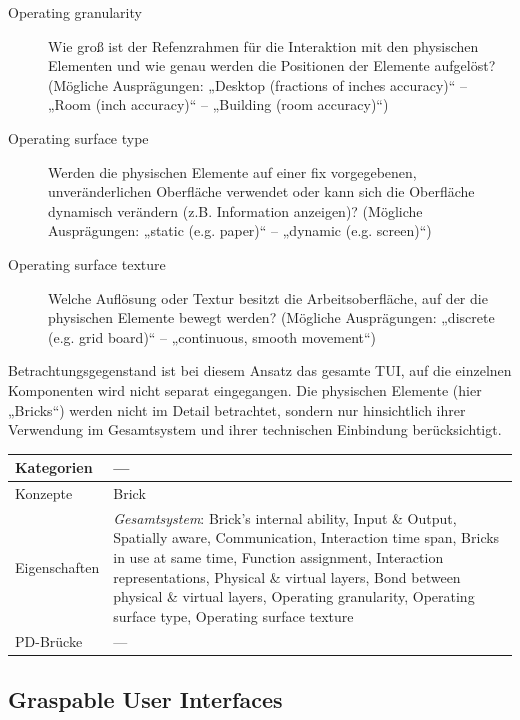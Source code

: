 \begin{description}
	\item[Operating granularity] Wie groß ist der Refenzrahmen für die Interaktion mit den physischen Elementen und wie genau werden die Positionen der Elemente aufgelöst? (Mögliche Ausprägungen: „Desktop (fractions of inches accuracy)“ -- „Room (inch accuracy)“ -- „Building (room accuracy)“)
	\item[Operating surface type] Werden die physischen Elemente auf einer fix vorgegebenen, unveränderlichen Oberfläche verwendet oder kann sich die Oberfläche dynamisch verändern (z.B. Information anzeigen)? (Mögliche Ausprägungen: „static (e.g. paper)“ -- „dynamic (e.g. screen)“)
	\item[Operating surface texture] Welche Auflösung oder Textur besitzt die Arbeitsoberfläche, auf der die physischen Elemente bewegt werden? (Mögliche Ausprägungen: „discrete (e.g. grid board)“ -- „continuous, smooth movement“)
\end{description}

Betrachtungsgegenstand ist bei diesem Ansatz das gesamte \gls{TUI}, auf die einzelnen Komponenten wird nicht separat eingegangen. Die physischen Elemente (hier „Bricks“) werden nicht im Detail betrachtet, sondern nur hinsichtlich ihrer Verwendung im Gesamtsystem und ihrer technischen Einbindung berücksichtigt.

\begin{tabular}{| p{3cm} | p{10cm} |}
  \hline
  Kategorien & --- \\ \hline
  Konzepte & Brick \\ \hline
  Eigenschaften & \emph{Gesamtsystem}: Brick's internal ability, Input \& Output, Spatially aware, Communication, Interaction time span, Bricks in use at same time, Function assignment, Interaction representations, Physical \& virtual layers, Bond between physical \& virtual layers, Operating granularity, Operating surface type, Operating surface texture \\ \hline
  PD-Brücke & --- \\ \hline
\end{tabular} 


\subsection{Graspable User Interfaces} %
\label{sub:graspable_user_interfaces}

